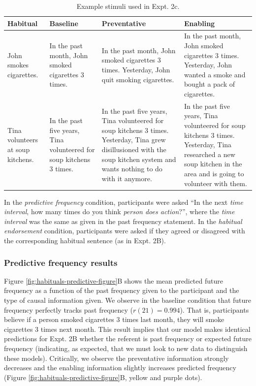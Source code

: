 \documentclass[english,,man,floatsintext]{apa6}
\theoremstyle{definition}
\theoremstyle{definition}
\theoremstyle{definition}
\theoremstyle{remark}
\begin{document}
\begin{table}[ht]
\centering
\begingroup\fontsize{9pt}{10pt}\selectfont
\begin{tabular}{ |p{1in}|p{1.75in}| p{1.75in}|p{1.75in} |}
  \hline
{\bfseries Habitual} & {\bfseries Baseline} & {\bfseries Preventative} & {\bfseries Enabling} \\ 
  \hline
John smokes cigarettes. & In the past month, John smoked cigarettes 3 times. & In the past month, John smoked cigarettes 3 times. Yesterday, John quit smoking cigarettes. & In the past month, John smoked cigarettes 3 times. Yesterday, John wanted a smoke and bought a pack of cigarettes. \\ 
   \hline
Tina volunteers at soup kitchens. & In the past five years, Tina volunteered for soup kitchens 3 times. & In the past five years, Tina volunteered for soup kitchens 3 times. Yesterday, Tina grew disillusioned with the soup kitchen system and wants nothing to do with it anymore. & In the past five years, Tina volunteered for soup kitchens 3 times. Yesterday, Tina researched a new soup kitchen in the area and is going to volunteer with them. \\ 
   \hline
\end{tabular}
\endgroup
\caption{Example stimuli used in Expt. 2c.} 
\end{table}

In the \emph{predictive frequency} condition, participants were asked
``In the next \emph{time interval}, how many times do you think
\emph{person does action}?'', where the \emph{time interval} was the
same as given in the past frequency statement. In the \emph{habitual
endorsement} condition, participants were asked if they agreed or
disagreed with the corresponding habitual sentence (as in Expt. 2B).

\hypertarget{predictive-frequency-results}{%
\subsubsection{Predictive frequency
results}\label{predictive-frequency-results}}

Figure \ref{fig:habituals-predictive-figure}B shows the mean predicted
future frequency as a function of the past frequency given to the
participant and the type of causal information given. We observe in the
baseline condition that future frequency perfectly tracks past frequency
(\(r(21) = 0.994\)). That is, participants believe if a person smoked
cigarettes 3 times last month, they will smoke cigarettes 3 times next
month. This result implies that our model makes identical predictions
for Expt. 2B whether the referent is past frequency or expected future
frequency (indicating, as expected, that we must look to new data to
distinguish these models). Critically, we observe the preventative
information strongly decreases and the enabling information slightly
increases predicted frequency (Figure
\ref{fig:habituals-predictive-figure}B, yellow and purple dots).
\end{document}
